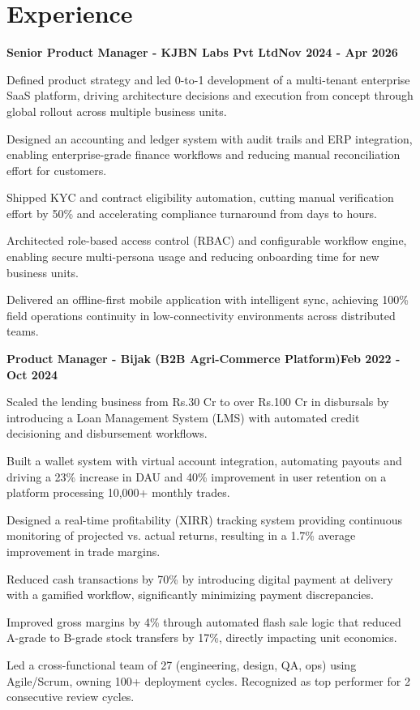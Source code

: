 \documentclass[letterpaper,11pt]{article}
\newcommand{\heading}[2]{
  \hspace{10pt}#1\hfill#2\\
}
\newcommand{\headingBf}[2]{
  \heading{\textbf{#1}}{\textbf{#2}}
}
\newenvironment{resume_list}{
  \vspace{-7pt}
  \begin{itemize}[itemsep=-2px, parsep=1pt, leftmargin=30pt]
}{
  \end{itemize}
}
\begin{document}
  \section{Experience}
  \headingBf{Senior Product Manager - KJBN Labs Pvt Ltd}{Nov 2024 - Apr 2026}
  \begin{resume_list}
    \item Defined product strategy and led 0-to-1 development of a multi-tenant enterprise SaaS platform, driving architecture decisions and execution from concept through global rollout across multiple business units.
    \item Designed an accounting and ledger system with audit trails and ERP integration, enabling enterprise-grade finance workflows and reducing manual reconciliation effort for customers.
    \item Shipped KYC and contract eligibility automation, cutting manual verification effort by 50\% and accelerating compliance turnaround from days to hours.
    \item Architected role-based access control (RBAC) and configurable workflow engine, enabling secure multi-persona usage and reducing onboarding time for new business units.
    \item Delivered an offline-first mobile application with intelligent sync, achieving 100\% field operations continuity in low-connectivity environments across distributed teams.
  \end{resume_list}
  \vspace{4pt}
  \headingBf{Product Manager - Bijak (B2B Agri-Commerce Platform)}{Feb 2022 - Oct 2024}
  \begin{resume_list}
    \item Scaled the lending business from Rs.30 Cr to over Rs.100 Cr in disbursals by introducing a Loan Management System (LMS) with automated credit decisioning and disbursement workflows.
    \item Built a wallet system with virtual account integration, automating payouts and driving a 23\% increase in DAU and 40\% improvement in user retention on a platform processing 10,000+ monthly trades.
    \item Designed a real-time profitability (XIRR) tracking system providing continuous monitoring of projected vs. actual returns, resulting in a 1.7\% average improvement in trade margins.
    \item Reduced cash transactions by 70\% by introducing digital payment at delivery with a gamified workflow, significantly minimizing payment discrepancies.
    \item Improved gross margins by 4\% through automated flash sale logic that reduced A-grade to B-grade stock transfers by 17\%, directly impacting unit economics.
    \item Led a cross-functional team of 27 (engineering, design, QA, ops) using Agile/Scrum, owning 100+ deployment cycles. Recognized as top performer for 2 consecutive review cycles.
  \end{resume_list}
\end{document}

